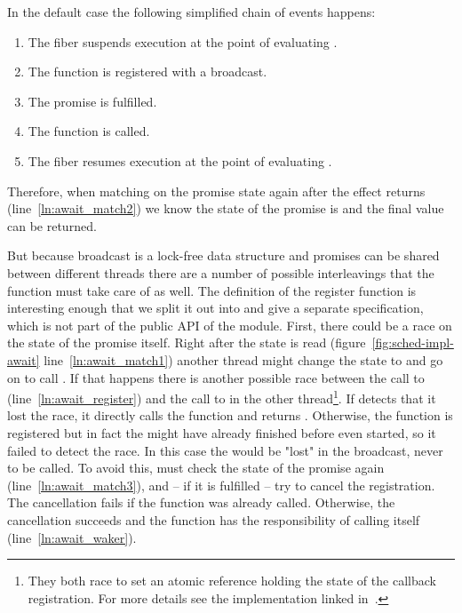 In the default case the following simplified chain of events happens:
\begin{enumerate}
  \item The fiber suspends execution at the point of evaluating .
  \item The  function is registered with a broadcast.
  \item The promise is fulfilled.
  \item The  function is called.
  \item The fiber resumes execution at the point of evaluating .
\end{enumerate}
Therefore, when matching on the promise state again after the \esuspend{} effect returns (line~\ref{ln:await_match2}) we know the state of the promise is  and the final value can be returned.

But because broadcast is a lock-free data structure and promises can be shared between different threads there are a number of possible interleavings that the  function must take care of as well.
The definition of the register function is interesting enough that we split it out into  and give a separate specification, which is not part of the public API of the module.
First, there could be a race on the state of the promise itself.
Right after the state is read (figure~\ref{fig:sched-impl-await} line~\ref{ln:await_match1}) another thread might change the state to  and go on to call .
If that happens there is another possible race between the call to  (line~\ref{ln:await_register}) and the call to  in the other thread\footnote{They both race to set an atomic reference holding the state of the callback registration. For more details see the implementation linked in~\cite{koval2023cqs}.}.
If  detects that it lost the race, it directly calls the  function and returns .
Otherwise, the  function is registered but in fact the  might have already finished before  even started, so it failed to detect the race.
In this case the  would be "lost" in the broadcast, never to be called.
To avoid this,  must check the state of the promise again (line~\ref{ln:await_match3}), and -- if it is fulfilled -- try to cancel the  registration.
The cancellation fails if the  function was already called.
Otherwise, the cancellation succeeds and the  function has the responsibility of calling  itself (line~\ref{ln:await_waker}).

